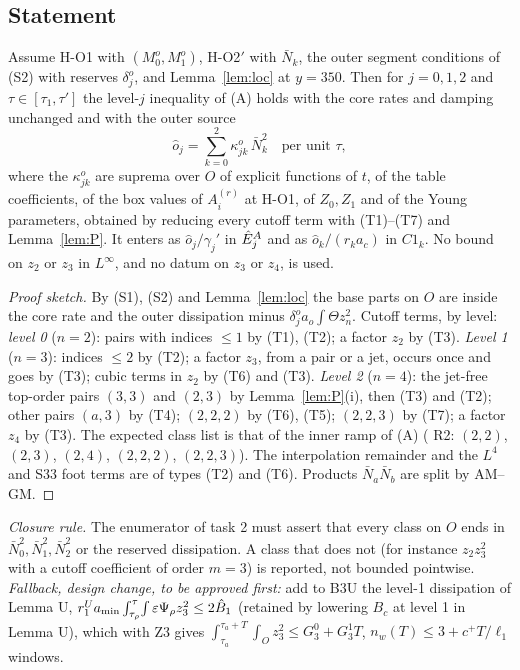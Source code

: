 \documentclass[11pt]{article}
\theoremstyle{definition}\newtheorem{definition}[theorem]{Definition}
\theoremstyle{remark}\newtheorem{remark}[theorem]{Remark}
\newcommand{\fn}[1]{\texttt{\detokenize{#1}}}
\newcommand{\Nb}{\bar N}\newcommand{\oh}{\hat o}
\begin{document}
\subsection{Statement}
\begin{proposition}[R5$'$]\label{prop:R5}
Assume \textup{H-O1} with $(M_0^o,M_1^o)$, \textup{H-O2$'$} with $\Nb_k$, the outer segment conditions of \textup{(S2)} with reserves $\delta^o_j$, and Lemma~\ref{lem:loc} at $y=350$. Then for $j=0,1,2$ and $\tau\in[\tau_1,\tau']$ the level-$j$ inequality of \textup{(A)} holds with the core rates and damping unchanged and with the outer source
\[
\oh_j=\sum_{k=0}^{2}\kappa^o_{jk}\,\Nb_k^2\quad\text{per unit }\tau,
\]
where the $\kappa^o_{jk}$ are suprema over $O$ of explicit functions of $t$, of the table coefficients, of the box values of $A_i^{(r)}$ at \textup{H-O1}, of $Z_0,Z_1$ and of the Young parameters, obtained by reducing every cutoff term with \textup{(T1)--(T7)} and Lemma~\ref{lem:P}. It enters as $\oh_j/\gamma_j'$ in $\hat E^A_j$ and as $\oh_k/(r_ka_c)$ in $C1_k$. No bound on $z_2$ or $z_3$ in $L^\infty$, and no datum on $z_3$ or $z_4$, is used.
\end{proposition}
\begin{proof}[Proof sketch]
By (S1), (S2) and Lemma~\ref{lem:loc} the base parts on $O$ are inside the core rate and the outer dissipation minus $\delta^o_ja_o\int\Theta z_n^2$. Cutoff terms, by level: \emph{level 0} ($n=2$): pairs with indices $\le1$ by (T1), (T2); a factor $z_2$ by (T3). \emph{Level 1} ($n=3$): indices $\le2$ by (T2); a factor $z_3$, from a pair or a jet, occurs once and goes by (T3); cubic terms in $z_2$ by (T6) and (T3). \emph{Level 2} ($n=4$): the jet-free top-order pairs $(3,3)$ and $(2,3)$ by Lemma~\ref{lem:P}(i), then (T3) and (T2); other pairs $(a,3)$ by (T4); $(2,2,2)$ by (T6), (T5); $(2,2,3)$ by (T7); a factor $z_4$ by (T3). The expected class list is that of the inner ramp of (A) (\fn{A_REPAIR.md} R2: $(2,2)$, $(2,3)$, $(2,4)$, $(2,2,2)$, $(2,2,3)$). The interpolation remainder and the $L^4$ and S33 foot terms are of types (T2) and (T6). Products $\Nb_a\Nb_b$ are split by AM--GM.
\end{proof}
\noindent\emph{Closure rule.} The enumerator of task 2 must assert that every class on $O$ ends in $\Nb_0^2,\Nb_1^2,\Nb_2^2$ or the reserved dissipation. A class that does not (for instance $z_2z_3^2$ with a cutoff coefficient of order $m=3$) is reported, not bounded pointwise. \emph{Fallback, design change, to be approved first:} add to B3U the level-1 dissipation of Lemma U, $r^U_1a_{\min}\int_{\tau_\rho}^\tau\!\int\varepsilon\Psi_\rho z_3^2\le2\hat B_1$ (retained by lowering $B_c$ at level 1 in Lemma U), which with Z3 gives $\int_{\tau_a}^{\tau_a+T}\!\int_Oz_3^2\le G^0_3+G^1_3T$, $n_w(T)\le3+c^+T/\ell_1$ windows.
\end{document}
